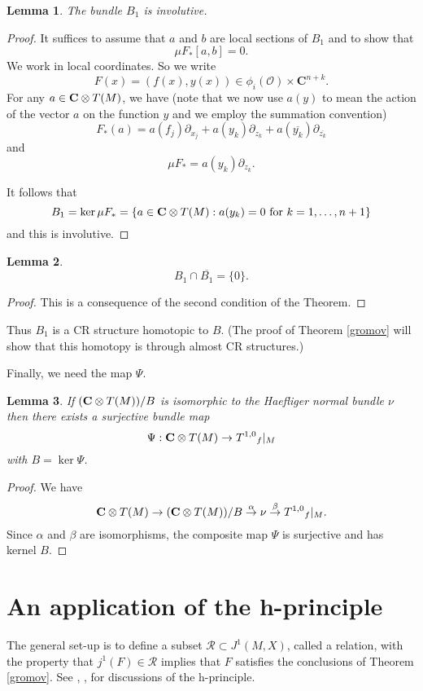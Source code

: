 \documentclass{amsart}
\newtheorem{lemma}{Lemma}[section]
\begin{document}
\begin{lemma}\label{involutive}
The bundle $B_1$ is involutive.  
\end{lemma}

\begin{proof}
 It suffices to assume that $a$ and $b$ are local sections of $B_1$ and to  show that
\[
\mu F_*[a,b]=0.
\]
We work in local coordinates.  So we write 
\[
F(x)=(f(x),y(x)) \in \phi _i({\mathcal{O}})\times{\mathbf{C}} ^{n+k}.
\]
For any $a\in {{\bf{C}}\otimes T(M)}$, we have (note that we now use $a(y)$ to mean the action of the vector $a$ on the function $y$ and we employ the summation convention)
\[
F_*(a) = a(f_j)\partial _{x_j}+a(y_k)\partial
_{z_k}+a(\overline{y_k})\partial _{\overline{z_k}}
\]
and 
\[
\mu F_*=a(y_k)\partial _{z_k} .
\]

It follows that
\[
B_1= \ker \mu  F_* =\{a\in {{\bf{C}}\otimes T(M)} : a(y_k)=0 \text{ for }k=1, \ldots
, n+1\}
\]
and this is involutive.
\end{proof}

\begin{lemma}
\[
B_1\cap \overline {B_1} = \{ 0\}.
\]
\end{lemma}

\begin{proof}
This is a consequence of the second condition of the Theorem.
\end{proof}

Thus $B_1$ is  a CR structure homotopic to $B$.  (The proof of Theorem
\ref{gromov} will show that this homotopy is through almost CR
structures.)

Finally, we need the map $\Psi$.

\begin{lemma}\label{f}
If $({{\bf{C}}\otimes T(M)} )/B$ is isomorphic to the Haefliger normal bundle $\nu$ then 
there exists a surjective bundle map 
\[
\Psi: {{\bf{C}}\otimes T(M)} \to {T^{1,0}} _f|_M
\]
with $B= \ker \Psi$.
\end{lemma}

\begin{proof}
We have
\[
{{\bf{C}}\otimes T(M)} \to ( {{\bf{C}}\otimes T(M)} )/B  \stackrel{\alpha}{ \to}\nu \stackrel {\beta}{\to} {T^{1,0}} _f|_M.
\]
Since $\alpha$ and $\beta$ are isomorphisms,  the composite map $\Psi$
is surjective and has kernel $B$.
\end{proof}

\section{An application of the h-principle}
The general set-up is to define a subset ${{\mathcal R}} \subset {J^1(M,X )}$,
called a relation, with the property that $j^1(F)\in {{\mathcal R}}$ implies
that $ F$ satisfies the conclusions of Theorem \ref{gromov}.  See
\cite{EM}, \cite{Gr}, \cite{Ja} for discussions of the h-principle.
\end{document}

